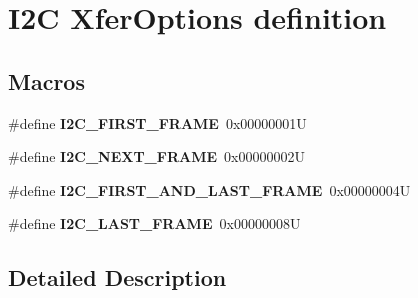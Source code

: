 \hypertarget{group___i2_c___xfer_options__definition}{}\section{I2C Xfer\+Options definition}
\label{group___i2_c___xfer_options__definition}
\subsection*{Macros}
\begin{DoxyCompactItemize}
\item 
\mbox{\label{group___i2_c___xfer_options__definition_gab23601bfc0eaddbc4823d193b7e49a9c}} 
\#define {\bfseries I2\+C\+\_\+\+F\+I\+R\+S\+T\+\_\+\+F\+R\+A\+ME}~0x00000001U
\item 
\mbox{\label{group___i2_c___xfer_options__definition_ga8790cd8bea154c662fc6a6d6ef6b9083}} 
\#define {\bfseries I2\+C\+\_\+\+N\+E\+X\+T\+\_\+\+F\+R\+A\+ME}~0x00000002U
\item 
\mbox{\label{group___i2_c___xfer_options__definition_ga56aa81e0fe6ff902f3b0dd0bc9e11b96}} 
\#define {\bfseries I2\+C\+\_\+\+F\+I\+R\+S\+T\+\_\+\+A\+N\+D\+\_\+\+L\+A\+S\+T\+\_\+\+F\+R\+A\+ME}~0x00000004U
\item 
\mbox{\label{group___i2_c___xfer_options__definition_gaf732cc5827622242ce14645f67749f40}} 
\#define {\bfseries I2\+C\+\_\+\+L\+A\+S\+T\+\_\+\+F\+R\+A\+ME}~0x00000008U
\end{DoxyCompactItemize}


\subsection{Detailed Description}
